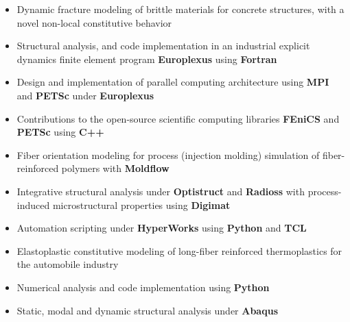 \documentclass[10pt,a4paper]{altacv}
\begin{document}
\divider

\begin{itemize}
\item Dynamic fracture modeling of brittle materials for concrete structures, with a novel non-local constitutive behavior
\item Structural analysis, and code implementation in an industrial explicit dynamics finite element program \textbf{Europlexus} using \textbf{Fortran}
\item Design and implementation of parallel computing architecture using \textbf{MPI} and \textbf{PETSc} under \textbf{Europlexus}
\item Contributions to the open-source scientific computing libraries \textbf{FEniCS} and \textbf{PETSc} using \textbf{C++}
\end{itemize}

\divider

\begin{itemize}
\item Fiber orientation modeling for process (injection molding) simulation of fiber-reinforced polymers with \textbf{Moldflow}
\item Integrative structural analysis under \textbf{Optistruct} and \textbf{Radioss} with process-induced microstructural properties using \textbf{Digimat}
\item Automation scripting under \textbf{HyperWorks} using \textbf{Python} and \textbf{TCL}
\end{itemize}

\divider

\begin{itemize}
\item Elastoplastic constitutive modeling of long-fiber reinforced thermoplastics for the automobile industry
\item Numerical analysis and code implementation using \textbf{Python}
\item Static, modal and dynamic structural analysis under \textbf{Abaqus}
\end{itemize}
\end{document}
